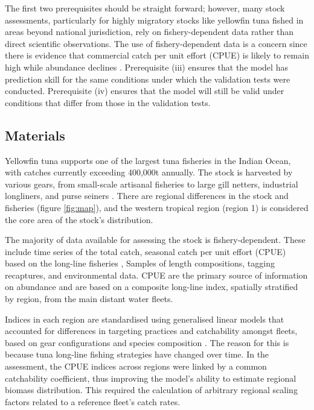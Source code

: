 \documentclass[11pt,a4paper]{article}
\begin{document}
{The first two prerequisites should be straight forward; however, many stock assessments, particularly for highly migratory stocks like yellowfin tuna fished in areas beyond national jurisdiction, rely on fishery-dependent data rather than direct scientific observations. The use of fishery-dependent data is a concern since there is evidence that commercial catch per unit effort (CPUE) is likely to remain high while abundance declines \citep{harley2001catch}.  Prerequisite (iii) ensures that the model has prediction skill for the same conditions under which the validation tests were conducted. Prerequisite (iv) ensures that the model will still be valid under conditions that differ from those in the validation tests.

\subsection{Materials}

Yellowfin tuna supports one of the largest tuna fisheries in the Indian Ocean, with catches currently exceeding 400,000t annually. The stock is harvested by various gears, from small-scale artisanal fisheries to large gill netters, industrial longliners, and purse seiners \citep{fiorellato2019tt}.
There are regional differences in the stock and fisheries (figure \ref{fig:map}), and the western tropical region (region 1) is considered the core area of the stock's distribution.

The majority of data available for assessing the stock is fishery-dependent. These include time series of the total catch, seasonal catch per unit effort (CPUE) based on the long-line fisheries \citep{hoyle2020scaling}, Samples of length compositions, tagging recaptures, and environmental data. CPUE are the primary source of information on abundance and are based on a composite long-line index,  spatially stratified by region, from the main distant water fleets. %

Indices in each region are standardised using generalised linear models that accounted for differences in targeting practices and catchability amongst fleets, based on gear configurations and species composition \citep{hoyle2020scaling}. The reason for this is because tuna long-line fishing strategies have changed over time. %
In the assessment, the CPUE indices across regions were linked by a common catchability coefficient, thus improving the model's ability to estimate regional biomass distribution. This required the calculation of arbitrary regional scaling factors related to a reference fleet's catch rates.%

}
\end{document}
